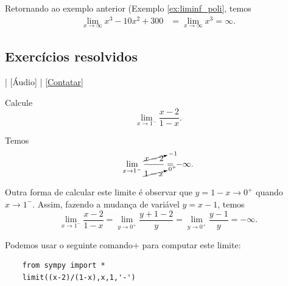 \begin{ex}
  Retornando ao exemplo anterior (Exemplo \ref{ex:liminf_poli}, temos
  \begin{align}
    \lim_{x\to \infty} x^3 - 10x^2 + 300 &= \lim_{x\to \infty} x^3 = \infty.
  \end{align}
\end{ex}

\subsection*{Exercícios resolvidos}

\begin{flushright}
  [Vídeo] | [Áudio] | \href{https://phkonzen.github.io/notas/contato.html}{[Contatar]}
\end{flushright}

\begin{exeresol}
  Calcule
  \begin{equation}
    \lim_{x\to 1^-} \frac{x-2}{1-x}. 
  \end{equation}
\end{exeresol}
\begin{resol}
  Temos
  \begin{align}
    \lim_{x\to 1^-} \frac{\cancelto{-1}{x-2}}{\cancelto{0^+}{1-x}} = -\infty.
  \end{align}

  Outra forma de calcular este limite é observar que $y = 1-x\to 0^+$ quando $x\to 1^-$. Assim, fazendo a mudança de variável $y = x-1$, temos
  \begin{equation}
    \lim_{x\to 1^-} \frac{x-2}{1-x} = \lim_{y\to 0^+} \frac{y+1-2}{y} = \lim_{y\to 0^+} \frac{y-1}{y} = -\infty.
  \end{equation}

  \ifispython
  Podemos usar o seguinte comando{\python}+{\sympy} para computar este limite:
  \begin{lstlisting}
    from sympy import *
    limit((x-2)/(1-x),x,1,'-')
  \end{lstlisting}
  \fi
\end{resol}

